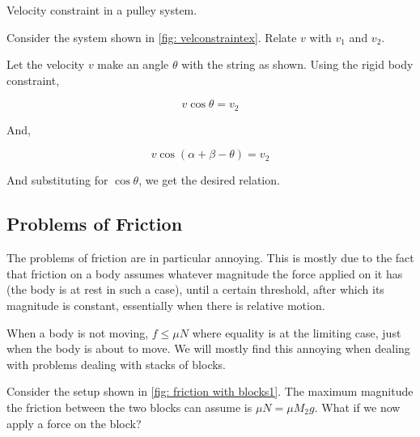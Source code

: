 \begin{marginfigure}
    \caption{Velocity constraint in a pulley system.}
    \label{fig: velconstraintex}
\end{marginfigure}

\begin{example}
    Consider the system shown in \cref{fig: velconstraintex}. Relate \(v\) with
    \(v_1\) and \(v_2\).
\end{example}

\begin{marginfigure}
\end{marginfigure}

\begin{soln}
        Let the velocity \(v\) make an angle \(\theta\) with the string as shown.
        Using the rigid body constraint,

        \begin{equation*}
            v\cos\theta = v_2
        \end{equation*}

        And,

        \begin{equation*}
            v\cos(\alpha+\beta-\theta) = v_2
        \end{equation*}

        And substituting for \(\cos\theta\), we get the desired relation.
    \end{soln}

\subsection{Problems of Friction}

The problems of friction are in particular annoying. This is mostly due to 
the fact that friction on a body assumes whatever magnitude the force applied
on it has (the body is at rest in such a case), until a certain threshold, after which its magnitude is constant, essentially 
when there is relative motion.

When a body is not moving, \(f \le \mu N\) where equality is at the limiting case, 
just when the body is about to move. We will mostly find this annoying when dealing with 
problems dealing with stacks of blocks.


Consider the setup shown in \cref{fig: friction with blocks1}. The maximum magnitude the 
friction between the two blocks can assume is \(\mu N = \mu M_2g\). What if we now apply 
a force on the block? 

